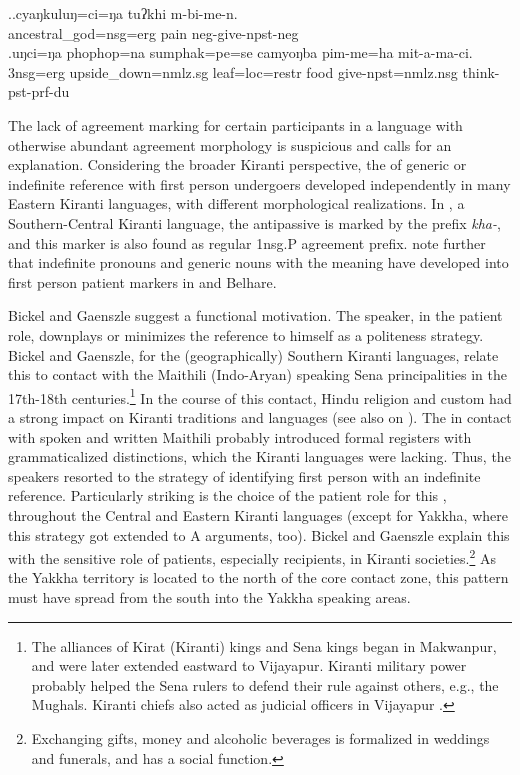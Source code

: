 \ex.\ag.cyaŋkuluŋ=ci=ŋa     tuʔkhi m-bi-me-n.\\
ancestral\_god{\sc =nsg=erg} pain {\sc neg-}give{\sc [3A;1.P]-npst-neg}\\
\bg.uŋci=ŋa   phophop=na  sumphak=pe=se   camyoŋba pim-me=ha mit-a-ma-ci.\\
{\sc 3nsg=erg} upside\_down{\sc =nmlz.sg} leaf{\sc =loc=restr} food  give{\sc [3A;1.P]-npst=nmlz.nsg} think{\sc -pst-prf-du}\\


The lack of agreement marking for certain participants in a language with otherwise abundant agreement morphology is suspicious and calls for an explanation. Considering the broader Kiranti perspective, the  of generic or indefinite reference with first person undergoers developed independently in many Eastern Kiranti languages, with different morphological realizations. In , a Southern-Central Kiranti language, the antipassive is marked by the prefix \emph{kha-}, and this marker is also found as regular 1{\sc nsg.}P agreement prefix.  \citet[6]{Bickeletal2005Generics} note further that indefinite pronouns and generic nouns with the meaning  have developed into first person patient markers in  and Belhare. 

Bickel and Gaenszle suggest a functional motivation. The speaker, in the patient role, downplays or minimizes the reference to himself as a politeness strategy.  Bickel and Gaenszle, for the (geographically) Southern Kiranti languages, relate this to contact with the Maithili (Indo-Aryan) speaking Sena principalities in the 17th-18th centuries.\footnote{The alliances of Kirat (Kiranti) kings and Sena kings began in Makwanpur, and were later extended eastward to Vijayapur. Kiranti military power probably helped the Sena rulers to defend their rule against others, e.g., the Mughals. Kiranti chiefs also acted as judicial officers in Vijayapur \citep[76]{Pradhan1991The-Gorkha}.} In the course of this contact, Hindu religion and custom had a strong impact on Kiranti traditions and languages (see also \citealt{Gaenszleetal2005Worshipping} on ). The in contact with  spoken and written Maithili probably introduced formal registers with grammaticalized  distinctions, which the Kiranti languages were lacking. Thus, the speakers resorted to the strategy of identifying first person with an indefinite reference. Particularly striking is  the  choice of the patient role for this , throughout the Central and Eastern Kiranti languages (except for Yakkha, where this strategy got extended to A arguments, too). Bickel and Gaenszle explain this with the sensitive role of patients, especially recipients, in Kiranti societies.\footnote{Exchanging gifts, money and alcoholic beverages is formalized in weddings and funerals, and has a social function.} As the Yakkha territory is located to the north of the core contact zone, this pattern must have spread from the south into the Yakkha speaking areas.


